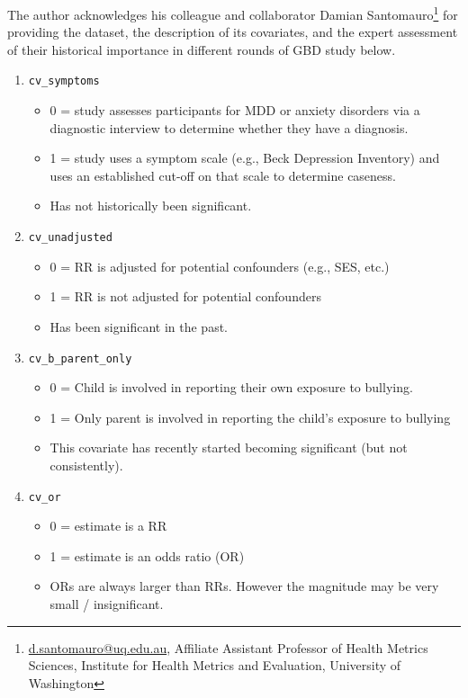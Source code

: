 \label{appendix:bullying_covariates}
The author acknowledges his colleague and collaborator Damian Santomauro\footnote{\href{mailto:d.santomauro@uq.edu.au}{d.santomauro@uq.edu.au}, Affiliate Assistant Professor of Health Metrics Sciences, Institute for Health Metrics and Evaluation, University of Washington} for providing the dataset, the description of its covariates, and the expert assessment of their historical importance in different rounds of GBD study below.
\begin{enumerate}
	\item \texttt{cv\_symptoms}
	\begin{itemize}
		\item 0 = study assesses participants for MDD or anxiety disorders via a diagnostic interview to determine whether they have a diagnosis. 
		\item 1 = study uses a symptom scale (e.g., Beck Depression Inventory) and uses an established cut-off on that scale to determine caseness. 
		\item Has not historically been significant. 
	\end{itemize}
	\item \texttt{cv\_unadjusted}
	\begin{itemize}
		\item 0 = RR is adjusted for potential confounders (e.g., SES, etc.)	
		\item 1 = RR is not adjusted for potential confounders
		\item Has been significant in the past.
	\end{itemize}
	\item \texttt{cv\_b\_parent\_only} 
	\begin{itemize}
		\item 0 = Child is involved in reporting their own exposure to bullying.
		\item 1 = Only parent is involved in reporting the child’s exposure to bullying
		\item This covariate has recently started becoming significant (but not consistently). 
	\end{itemize}
	\item \texttt{cv\_or}
	\begin{itemize}
		\item 0 = estimate is a RR
		\item 1 = estimate is an odds ratio (OR)
		\item ORs are always larger than RRs. However the magnitude may be very small / insignificant.
	\end{itemize}

\end{enumerate}
